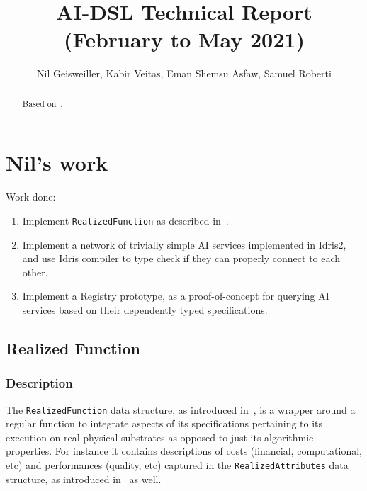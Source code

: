 \documentclass[]{report}
\begin{document}
\title{AI-DSL Technical Report (February to May 2021)}
\author{Nil Geisweiller, Kabir Veitas, Eman Shemsu Asfaw, Samuel Roberti}
\maketitle

\begin{abstract}
Based on~\cite{GoertzelGeisweillerBlog}.
\end{abstract}

\tableofcontents

\chapter{Nil's work}

Work done:
\begin{enumerate}
\item Implement \texttt{RealizedFunction} as described
  in~\cite{GoertzelGeisweillerBlog}.
\item Implement a network of trivially simple AI services implemented
  in Idris2, and use Idris compiler to type check if they can properly
  connect to each other.
\item Implement a Registry prototype, as a proof-of-concept for
  querying AI services based on their dependently typed
  specifications.
\end{enumerate}

\section{Realized Function}
\label{realized_function}

\subsection{Description}

The \texttt{RealizedFunction} data structure, as introduced
in~\cite{GoertzelGeisweillerBlog}, is a wrapper around a regular
function to integrate aspects of its specifications pertaining to its
execution on real physical substrates as opposed to just its
algorithmic properties.  For instance it contains descriptions of
costs (financial, computational, etc) and performances (quality, etc)
captured in the \texttt{RealizedAttributes} data structure, as
introduced in~\cite{GoertzelGeisweillerBlog} as well.
\end{document}
